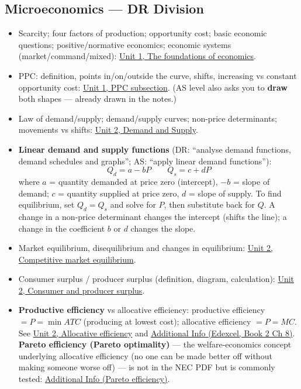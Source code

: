\documentclass[a4paper,12pt]{article}
\begin{document}
\subsection*{Microeconomics --- DR Division}
\begin{itemize}
  \item Scarcity; four factors of production; opportunity cost; basic economic questions; positive/normative economics; economic systems (market/command/mixed): \hyperref[sec:foundations]{Unit 1, The foundations of economics}.
  \item PPC: definition, points in/on/outside the curve, shifts, increasing vs constant opportunity cost: \hyperref[sec:foundations]{Unit 1, PPC subsection}. (AS level also asks you to \textbf{draw} both shapes --- already drawn in the notes.)
  \item Law of demand/supply; demand/supply curves; non-price determinants; movements vs shifts: \hyperref[sec:demand-supply]{Unit 2, Demand and Supply}.
  \item \textbf{Linear demand and supply functions} (DR: ``analyse demand functions, demand schedules and graphs''; AS: ``apply linear demand functions''):
  \[Q_d = a - bP \qquad Q_s = c + dP\]
  where $a$ = quantity demanded at price zero (intercept), $-b$ = slope of demand; $c$ = quantity supplied at price zero, $d$ = slope of supply. To find equilibrium, set $Q_d = Q_s$ and solve for $P$, then substitute back for $Q$. A change in a non-price determinant changes the intercept (shifts the line); a change in the coefficient $b$ or $d$ changes the slope.
  \item Market equilibrium, disequilibrium and changes in equilibrium: \hyperref[sec:demand-supply]{Unit 2, Competitive market equilibrium}.
  \item Consumer surplus / producer surplus (definition, diagram, calculation): \hyperref[sec:demand-supply]{Unit 2, Consumer and producer surplus}.
  \item \textbf{Productive efficiency} vs allocative efficiency: productive efficiency $= P = \min ATC$ (producing at lowest cost); allocative efficiency $= P = MC$. See \hyperref[sec:demand-supply]{Unit 2, Allocative efficiency} and \hyperref[sec:add-efficiency]{Additional Info (Edexcel, Book 2 Ch 8)}. \textbf{Pareto efficiency (Pareto optimality)} --- the welfare-economics concept underlying allocative efficiency (no one can be made better off without making someone worse off) --- is not in the NEC PDF but is commonly tested: \hyperref[sec:add-pareto]{Additional Info (Pareto efficiency)}.

\end{itemize}
\end{document}
